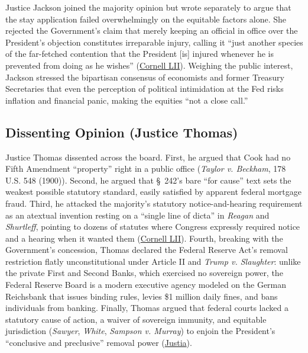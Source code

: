 \documentclass[12pt]{article}
\begin{document}
Justice Jackson joined the majority opinion but wrote separately to argue that the stay application failed overwhelmingly on the equitable factors alone. She rejected the Government's claim that merely keeping an official in office over the President's objection constitutes irreparable injury, calling it ``just another species of the far-fetched contention that the President [is] injured whenever he is prevented from doing as he wishes'' (\href{https://www.law.cornell.edu/supremecourt/text/25A312}{Cornell LII}). Weighing the public interest, Jackson stressed the bipartisan consensus of economists and former Treasury Secretaries that even the perception of political intimidation at the Fed risks inflation and financial panic, making the equities ``not a close call.''

\subsection{Dissenting Opinion (Justice Thomas)}

Justice Thomas dissented across the board. First, he argued that Cook had no Fifth Amendment ``property'' right in a public office (\textit{Taylor v. Beckham}, 178 U.S. 548 (1900)). Second, he argued that \S~242's bare ``for cause'' text sets the weakest possible statutory standard, easily satisfied by apparent federal mortgage fraud. Third, he attacked the majority's statutory notice-and-hearing requirement as an atextual invention resting on a ``single line of dicta'' in \textit{Reagan} and \textit{Shurtleff}, pointing to dozens of statutes where Congress expressly required notice and a hearing when it wanted them (\href{https://www.law.cornell.edu/supremecourt/text/25A312}{Cornell LII}). Fourth, breaking with the Government's concession, Thomas declared the Federal Reserve Act's removal restriction flatly unconstitutional under Article II and \textit{Trump v. Slaughter}: unlike the private First and Second Banks, which exercised no sovereign power, the Federal Reserve Board is a modern executive agency modeled on the German Reichsbank that issues binding rules, levies \$1 million daily fines, and bans individuals from banking. Finally, Thomas argued that federal courts lacked a statutory cause of action, a waiver of sovereign immunity, and equitable jurisdiction (\textit{Sawyer}, \textit{White}, \textit{Sampson v. Murray}) to enjoin the President's ``conclusive and preclusive'' removal power (\href{https://supreme.justia.com/cases/federal/us/609/25a312/}{Justia}).
\end{document}
